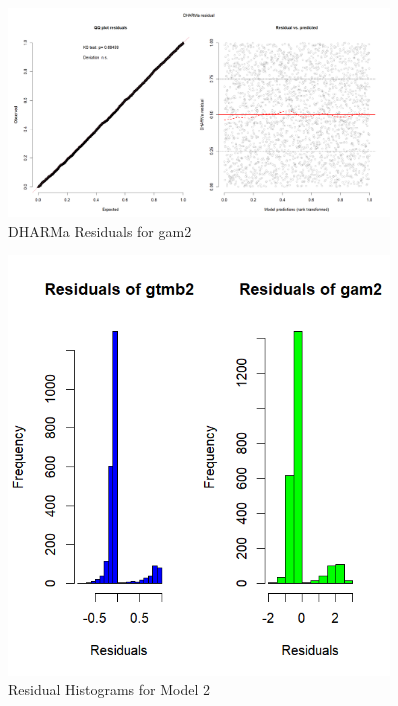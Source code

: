 \begin{figure}[h]
    \centering
    \includegraphics[width=0.9\textwidth]{visuals/DHARMa_gam2.png}
    \caption{DHARMa Residuals for gam2}
    \label{fig:dharmagam2}
\end{figure}

\begin{figure}[h]
    \centering
    \includegraphics[width=0.9\textwidth]{visuals/reidualshists_2.png}
    \caption{Residual Histograms for Model 2}
    \label{fig:residualhists2}
\end{figure}

